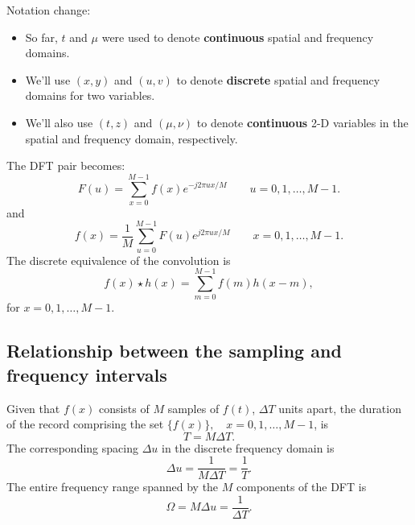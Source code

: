 
\begin{frame}
Notation change:
\begin{itemize}
\item So far, $t$ and $\mu$ were used to denote \textbf{continuous} spatial and frequency domains.
\item We'll use $(x,y)$ and $(u,v)$ to denote \textbf{discrete} spatial and frequency domains for two variables.
\item We'll also use $(t,z)$ and $(\mu, \nu)$ to denote \textbf{continuous} 2-D variables in the spatial and frequency domain, respectively.
\end{itemize}
\end{frame}


\begin{frame}
The DFT pair becomes:
\begin{equation}
F(u) = \sum_{x=0}^{M-1} f(x) e ^{-j2\pi ux/M}\qquad u=0,1,\ldots,M-1.
\end{equation}
and
\begin{equation}
f(x) = \dfrac{1}{M} \sum_{u=0}^{M-1} F(u) e^{j2\pi ux/M}\qquad x=0,1,\ldots,M-1.
\end{equation}
The discrete equivalence of the convolution is
\begin{equation}
\boxed{
f(x)\star h(x) = \sum_{m=0}^{M-1} f(m)h(x-m)
},
\end{equation}
for $x = 0,1,\ldots, M-1$.
\end{frame}


\subsection{Relationship between the sampling and frequency intervals}


\begin{frame}
Given that $f(x)$ consists of $M$ samples of $f(t)$, $\Delta T$ units apart, the duration of the record comprising the set $\{f(x)\},\quad x = 0,1,\ldots,M-1$, is
\begin{equation}
T=M\Delta T.
\end{equation}
The corresponding spacing $\Delta u$ in the discrete frequency domain is
\begin{equation}
\Delta u = \dfrac{1}{M\Delta T} = \dfrac{1}{T}.
\end{equation}
The entire frequency range spanned by the $M$ components of the DFT is
\begin{equation}
\Omega = M\Delta u = \dfrac{1}{\Delta T}.
\end{equation}
\end{frame}

